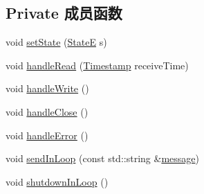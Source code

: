 \subsection*{Private 成员函数}
\begin{DoxyCompactItemize}
\item 
void \hyperlink{classmuduo_1_1TcpConnection_a5cefef7ea6272b740592d9dfecbd6c20}{set\+State} (\hyperlink{classmuduo_1_1TcpConnection_a8cf72f776f4277c8138a1beaf5185325}{StateE} s)
\item 
void \hyperlink{classmuduo_1_1TcpConnection_afca05707020dd916739c07555d4769a0}{handle\+Read} (\hyperlink{classmuduo_1_1Timestamp}{Timestamp} receive\+Time)
\item 
void \hyperlink{classmuduo_1_1TcpConnection_ae1d79ff6580eaced59a900144818150d}{handle\+Write} ()
\item 
void \hyperlink{classmuduo_1_1TcpConnection_a2cb2baff35786f9caa991e3c47908d91}{handle\+Close} ()
\item 
void \hyperlink{classmuduo_1_1TcpConnection_a70b275e63748ddd6da7d2171c540ccff}{handle\+Error} ()
\item 
void \hyperlink{classmuduo_1_1TcpConnection_a016986a5f7c6f0d415e25b4b6bdbf481}{send\+In\+Loop} (const std\+::string \&\hyperlink{test13_8cc_a36bd74109f547f7f8198faf5a12d2879}{message})
\item 
void \hyperlink{classmuduo_1_1TcpConnection_a4f988229386dc4e5f80cca96e096e074}{shutdown\+In\+Loop} ()
\end{DoxyCompactItemize}
